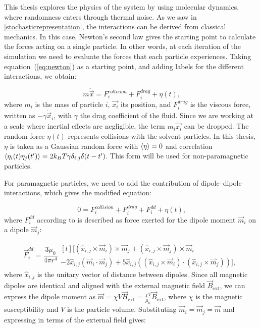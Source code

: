 This thesis explores the physics of the system by using molecular dynamics, where randomness enters through thermal noise. As we saw in \ref{stochasticrepresentation}, the interactions can be derived from classical mechanics. In this case, Newton’s second law gives the starting point to calculate the forces acting on a single particle. In other words, at each iteration of the simulation we need to evaluate the forces that each particle experiences. Taking equation~(\ref{eq:newton}) as a starting point, and adding labels for the different interactions, we obtain:

\begin{equation}
  m\ddot{\vec{x}} = F^{collision}_i + F^{drag}_i + \eta(t)\text{,}
  \label{eq:langevinratchet}
\end{equation}
where $m_i$ is the mass of particle $i$, $\vec{x_i}$ its position, and $F^{drag}_i$ is the viscous force, written as $-\gamma \dot{\vec{x}}_i$, with $\gamma$ the drag coefficient of the fluid. Since we are working at a scale where inertial effects are negligible, the term $m_i\ddot{\vec{x_i}}$ can be dropped. The random force $\eta(t)$ represents collisions with the solvent particles. In this thesis, $\eta$ is taken as a Gaussian random force with $\expval{\eta} = 0$ and correlation $\expval{\eta_i(t)\eta_j(t')} = 2k_B T \gamma \delta_{i,j}\delta(t-t')$. This form will be used for non-paramagnetic particles.

For paramagnetic particles, we need to add the contribution of dipole–dipole interactions, which gives the modified equation:

\begin{equation}
  0 = F^{collision}_i + F^{drag}_i + F^{dd}_i + \eta(t)\text{,}
  \label{eq:langevindipole}
\end{equation}
where $F^{dd}_i$ according to \cite{yung1998analytic} is described as force exerted for the dipole moment $\vec{m}_i$ on a dipole $\vec{m}_j$:

\begin{equation}
  \label{eq:dipoledipoleforce}
\vec{F}^{dd}_i = \frac{3\mu_0}{4\pi r^4}
\begin{multlined}[t]
\bigl[ (\hat{x}_{i,j} \times \vec{m}_i) \times \vec{m}_j
    + (\hat{x}_{i,j} \times \vec{m}_j) \times \vec{m}_i \\
    - 2\hat{x}_{i,j}(\vec{m}_i \cdot \vec{m}_j)
    + 5\hat{x}_{i,j}((\hat{x}_{i,j} \times \vec{m}_i) \cdot (\hat{x}_{i,j} \times \vec{m}_j)) \bigr],
\end{multlined}
\end{equation}
where $\hat{x}_{i,j}$ is the unitary vector of distance between dipoles. Since all magnetic dipoles are identical and aligned with the external magnetic field $\vec{B}_{\text{ext}}$, we can express the dipole moment as $\vec{m} = \chi V \vec{H}_{\text{ext}} = \frac{\chi V}{\mu_0} \vec{B}_{\text{ext}}$, where $\chi$ is the magnetic susceptibility and $V$ is the particle volume. Substituting $\vec{m}_i = \vec{m}_j = \vec{m}$ and expressing in terms of the external field gives:

